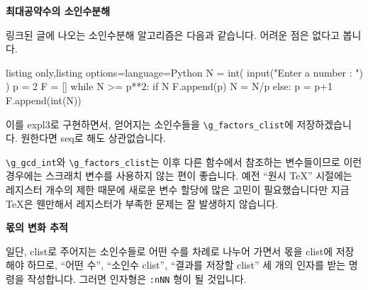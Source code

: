 \documentclass[a4paper,amsmath]{oblivoir}
\makeatletter
\let\ATonum\@onum
\makeatother
\begin{document}
\bigskip

\textbf{\ATonum 2 최대공약수의 소인수분해}

링크된 글에 나오는 소인수분해 알고리즘은 다음과 같습니다. 어려운 점은 없다고 봅니다.

\begin{tcblisting}{listing only,listing options={language=Python}}
N = int( input("Enter a number : ") )
p = 2
F = []
while N >= p**2:
    if N%
        F.append(p)
        N = N/p
    else:
        p = p+1
F.append(int(N))
\end{tcblisting}

이를 expl3로 구현하면서, 얻어지는 소인수들을 \verb|\g_factors_clist|에 저장하겠습니다.
원한다면 seq로 해도 상관없습니다.


\verb|\g_gcd_int|와 \verb|\g_factors_clist|는 이후 다른 함수에서 참조하는 
변수들이므로 이런 경우에는 스크래치 변수를 사용하지 않는 편이 좋습니다.
예전 “원시 \TeX” 시절에는 레지스터 개수의 제한 때문에 새로운 변수 할당에 많은 
고민이 필요했습니다만 지금 \TeX 은 웬만해서 레지스터가 부족한 문제는 잘 발생하지 않습니다.

\bigskip

\textbf{\ATonum 3 몫의 변화 추적}

일단, clist로 주어지는 소인수들로 어떤 수를 차례로 나누어 가면서 몫을 clist에 저장해야 하므로,
“어떤 수”, “소인수 clist”, “결과를 저장할 clist” 세 개의 인자를 받는 명령을 작성합니다.
그러면 인자형은 \verb|:nNN| 형이 될 것입니다.
\end{document}
